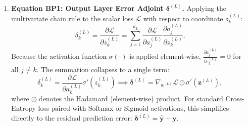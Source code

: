 \begin{enumerate}[noitemsep,topsep=2pt,parsep=0pt,partopsep=0pt]
  \item \textbf{Equation BP1: Output Layer Error Adjoint $\boldsymbol{\delta}^{(L)}$.}
  Applying the multivariate chain rule to the scalar loss $\mathcal{L}$ with respect to coordinate $z_k^{(L)}$:
  \begin{equation}
  \delta_k^{(L)} = \frac{\partial \mathcal{L}}{\partial z_k^{(L)}} = \sum_{j=1}^{d_L} \frac{\partial \mathcal{L}}{\partial a_j^{(L)}} \frac{\partial a_j^{(L)}}{\partial z_k^{(L)}}.
  \end{equation}
  Because the activation function $\sigma(\cdot)$ is applied element-wise, $\frac{\partial a_j^{(L)}}{\partial z_k^{(L)}} = 0$ for all $j \ne k$. The summation collapses to a single term:
  \begin{equation}
  \delta_k^{(L)} = \frac{\partial \mathcal{L}}{\partial a_k^{(L)}} \sigma'\left( z_k^{(L)} \right) \implies \boldsymbol{\delta}^{(L)} = \nabla_{\mathbf{a}^{(L)}} \mathcal{L} \odot \sigma'\left( \mathbf{z}^{(L)} \right),
  \label{eq:bp1_output_error}
  \end{equation}
  where $\odot$ denotes the Hadamard (element-wise) product. For standard Cross-Entropy loss paired with Softmax or Sigmoid activations, this simplifies directly to the residual prediction error: $\boldsymbol{\delta}^{(L)} = \hat{\mathbf{y}} - \mathbf{y}$.


\end{enumerate}
